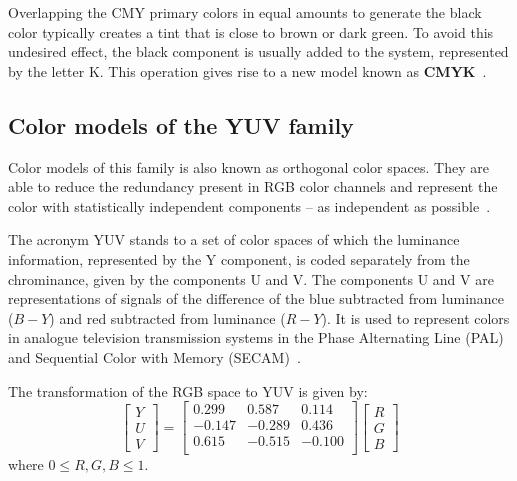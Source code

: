 Overlapping the CMY primary colors in equal amounts to generate the black color typically creates a tint that is close to brown or dark green. To avoid this undesired effect, the black component is usually added to the system, represented by the letter K. This operation gives rise to a new model known as \textbf{CMYK}~\citep{gonzalez:02}.


\subsection{Color models of the YUV family}
\label{sec:modelo_cores_yuv}

Color models of this family is also known as orthogonal color spaces. They are able to reduce the redundancy present in RGB color channels and represent the color with statistically independent components -- as independent as possible~\citep{kakumanu:07}.

The acronym YUV stands to a set of color spaces of which the luminance information, represented by the Y component, is coded separately from the chrominance, given by the components U and V. The components U and V are representations of signals of the difference of the blue subtracted from luminance ($B-Y$) and red subtracted from luminance ($R-Y$). It is used to represent colors in analogue television transmission systems in the Phase Alternating Line (PAL) and Sequential Color with Memory (SECAM)~\citep{pedrini:08}.

The transformation of the RGB space to YUV is given by:\\
\begin{equation}
  \begin{bmatrix}
    Y \\ U \\ V
  \end{bmatrix} = 
  \begin{bmatrix}
     0.299 &  0.587 &  0.114 \\
    -0.147 & -0.289 &  0.436 \\
     0.615 & -0.515 & -0.100 \\
  \end{bmatrix}
  \begin{bmatrix}
    R \\ G \\ B
  \end{bmatrix}
\end{equation}
where $0 \leq R, G, B \leq 1$.

